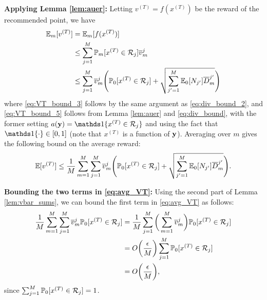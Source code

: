 \documentclass[english,onecolumn,final,11pt]{IEEEtran} %
\newcommand{\Dbar}{\overline{D}}
\begin{document}
{\bf Applying Lemma \ref{lem:auer}:} Letting $v^{(T)} = f(x^{(T)})$ be the reward of the recommended point, we have
\begin{align}
	\EE_{m}[v^{(T)}] 
		&= \EE_m[ f(x^{(T)}) ] \\
		&\le \sum_{j=1}^M \PP_m[x^{(T)} \in \Rc_j] \vbar_m^j \label{eq:VT_bound_3} \\
		&\le \sum_{j=1}^M \vbar_m^j \Bigg( \PP_0[ x^{(T)} \in \Rc_j ] + \sqrt{ \sum_{j'=1}^M \EE_0[N_{j'}]\Dbar_m^{j'} } \Bigg) \label{eq:VT_bound_5}
\end{align}
where \eqref{eq:VT_bound_3} follows by the same argument as \eqref{eq:div_bound_2}, and \eqref{eq:VT_bound_5} follows from Lemma \ref{lem:auer} and \eqref{eq:div_bound}, with the former setting $a(\yv) = \openone\{ x^{(T)} \in \Rc_j \}$ and using the fact that $\openone\{\cdot\} \in [0,1]$ (note that $x^{(T)}$ is a function of $\mathbf{y}$).  Averaging over $m$ gives the following bound on the average reward:
\begin{equation}
	\EE[v^{(T)}] \le \frac{1}{M}\sum_{m=1}^M \sum_{j=1}^M \vbar_m^j \Bigg( \PP_0[ x^{(T)} \in \Rc_j ] + \sqrt{ \sum_{j'=1}^M \EE_0[N_{j'}]\Dbar_m^{j'} } \Bigg). \label{eq:avg_VT}
\end{equation}

\textbf{Bounding the two terms in \eqref{eq:avg_VT}:} Using the second part of Lemma \ref{lem:vbar_sums}, we can bound the first term in \eqref{eq:avg_VT} as follows:
\begin{align}
	\frac{1}{M}\sum_{m=1}^M \sum_{j=1}^M \overline{v}_m^j \mathbb{P}_0[ x^{(T)} \in \mathcal{R}_j ] 
    	&= \frac{1}{M}\sum_{j=1}^M \bigg(\sum_{m=1}^M  \overline{v}_m^j\bigg) \mathbb{P}_0[ x^{(T)} \in \mathcal{R}_j ]  \\
    	& = O\bigg(\frac{\epsilon}{M}\bigg) \sum_{j=1}^M \mathbb{P}_0[ x^{(T)} \in \mathcal{R}_j ] \\
    	& = O\bigg(\frac{\epsilon}{M}\bigg), \label{eq:first_term_3}
\end{align}
since $\sum_{j=1}^M \mathbb{P}_0[ x^{(T)} \in \mathcal{R}_j ] = 1$.
\end{document}
